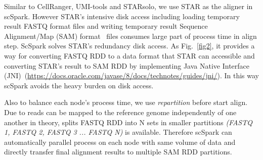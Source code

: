 \documentclass[conference]{IEEEtran}
\begin{document}

Similar to CellRanger, UMI-tools and STARsolo, we use STAR as the aligner in scSpark.
However STAR's intensive disk access including loading temporary result FASTQ format files and writing temporary result Sequence Alignment/Map (SAM) format~\cite{li2009sequence} files consumes large part of process time in align step.
ScSpark solves STAR's redundancy disk access.
As Fig.~\ref{fig2}, it provides a way for converting FASTQ RDD to a data format that STAR can accessible and converting STAR's result to SAM RDD by implementing Java Native Interface (JNI)~(\url{https://docs.oracle.com/javase/8/docs/technotes/guides/jni/}).
In this way scSpark avoids the heavy burden on disk access. %

Also to balance each node's process time, we use \textit{repartition} before start align.
Due to reads can be mapped to the reference genome independently of one another in theory, splits FASTQ RDD into N sets in smaller partitions \textit{(FASTQ 1, FASTQ 2, FASTQ 3 ... FASTQ N)} is available.
Therefore scSpark can automatically parallel process on each node with same volume of data and directly transfer final alignment results to multiple SAM RDD partitions.

\end{document}
